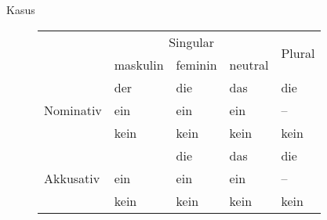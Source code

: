\begin{syntax}{Kasus}{}
\begin{figure}[H]
\begin{tabular}{|l|l|l|l|l|}
\hline
	& \multicolumn{3}{c|}{Singular} & \multirow{2}{*}{Plural} \\
\cline{2-4}
	& maskulin & feminin & neutral & \\
\hline
	\multirow{3}{*}{Nominativ}	& der & die & das & die \\
								& ein & ein\att{e} & ein & -- \\
								& kein & kein\att{e} & kein & kein\att{e} \\
\hline
	\multirow{3}{*}{Akkusativ}	& \att{den} & die & das & die \\
								& ein\att{en} & ein\att{e} & ein & -- \\
								& kein\att{en} & kein\att{e} & kein & kein\att{e} \\
\hline
\end{tabular}
\end{figure}
\end{syntax}
